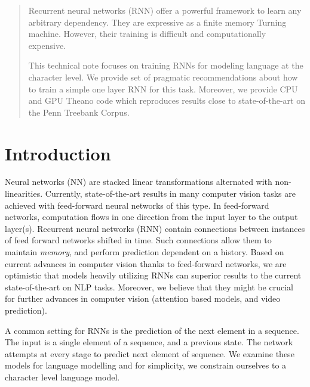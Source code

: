 \documentclass{article}
\begin{document}
 


\begin{abstract} 
  Recurrent neural networks (RNN) offer a powerful framework to learn any arbitrary dependency.
  They are expressive as a finite memory Turning machine. However, their 
  training is difficult and computationally expensive.

  This technical note focuses on training RNNs for modeling language
  at the character level.  We provide set of pragmatic recommendations
  about how to train a simple one layer RNN for this task.
  Moreover, we provide CPU and GPU Theano
  \cite{bergstra+al:2010-scipy} code which reproduces results close to
  state-of-the-art on the Penn Treebank Corpus.
\end{abstract} 

\section{Introduction}
Neural networks (NN) are stacked linear transformations alternated
with non-linearities.  Currently, state-of-the-art results in many
computer vision tasks are achieved with feed-forward neural networks
of this type.
In feed-forward networks, computation flows in one direction from the input
layer to the output layer(s).  Recurrent neural networks (RNN) contain
connections between instances of feed forward networks shifted in
time. Such connections allow them to maintain {\em memory}, and perform
prediction dependent on a history. Based on current advances in
computer vision thanks to feed-forward networks, we are optimistic that
models heavily utilizing RNNs can superior results to the current
state-of-the-art on NLP tasks.  Moreover, we believe that they
might be crucial for further advances in computer vision (attention
based models, and video prediction).


A common setting for RNNs is the prediction of the next element in a
sequence. The input is a single element of a sequence, and a previous
state. The network attempts at every stage to predict next element of
sequence.  We examine these models for language modelling and for
simplicity, we constrain ourselves to a character level language
model.
\end{document}
